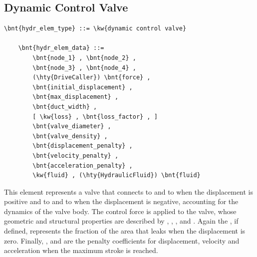 \subsection{Dynamic Control Valve}
\label{sec:EL:HYDR:DYNAMIC_CONTROL_VALVE}
\begin{Verbatim}[commandchars=\\\{\}]
    \bnt{hydr_elem_type} ::= \kw{dynamic control valve}

    \bnt{hydr_elem_data} ::=
        \bnt{node_1} , \bnt{node_2} ,
        \bnt{node_3} , \bnt{node_4} ,
        (\hty{DriveCaller}) \bnt{force} ,
        \bnt{initial_displacement} ,
        \bnt{max_displacement} ,
        \bnt{duct_width} ,
        [ \kw{loss} , \bnt{loss_factor} , ]
        \bnt{valve_diameter} ,
        \bnt{valve_density} ,
        \bnt{displacement_penalty} ,
        \bnt{velocity_penalty} ,
        \bnt{acceleration_penalty} ,
        \kw{fluid} , (\hty{HydraulicFluid}) \bnt{fluid}
\end{Verbatim}
This element represents a valve that connects
 to  and  to 
when the displacement is positive and  to 
and  to  when the displacement is negative,
accounting for the dynamics of the valve body.
The control force  is applied to the valve, whose 
geometric and structural properties are described by 
, ,
,  and .
Again the , if defined, represents the fraction
of the area that leaks when the displacement is zero.
Finally, ,  and 
are the penalty coefficients for displacement, velocity and acceleration
when the maximum stroke is reached.




